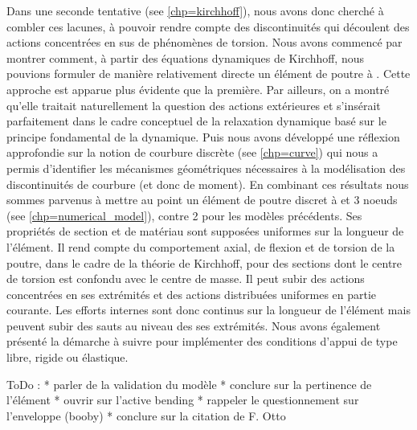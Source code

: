 Dans une seconde tentative (see \cref{chp=kirchhoff}), nous avons donc cherché à combler ces lacunes, à pouvoir rendre compte des discontinuités qui découlent des actions concentrées en sus de phénomènes de torsion. Nous avons commencé par montrer comment, à partir des équations dynamiques de Kirchhoff, nous pouvions formuler de manière relativement directe un élément de poutre à . Cette approche est apparue plus évidente que la première. Par ailleurs, on a montré qu'elle traitait naturellement la question des actions extérieures et s'insérait parfaitement dans le cadre conceptuel de la relaxation dynamique basé sur le principe fondamental de la dynamique. Puis nous avons développé une réflexion approfondie sur la notion de courbure discrète (see \cref{chp=curve}) qui nous a permis d'identifier les mécanismes géométriques nécessaires à la modélisation des discontinuités de courbure (et donc de moment). En combinant ces résultats nous sommes parvenus à mettre au point un élément de poutre discret à  et 3 noeuds (see \cref{chp=numerical_model}), contre 2 pour les modèles précédents. Ses propriétés de section et de matériau sont supposées uniformes sur la longueur de l'élément. Il rend compte du comportement axial, de flexion et de torsion de la poutre, dans le cadre de la théorie de Kirchhoff, pour des sections dont le centre de torsion est confondu avec le centre de masse. Il peut subir des actions concentrées en ses extrémités et des actions distribuées uniformes en partie courante. Les efforts internes sont donc continus sur la longueur de l'élément mais peuvent subir des sauts au niveau des ses extrémités. Nous avons également présenté la démarche à suivre pour implémenter des conditions d'appui de type libre, rigide ou élastique.

ToDo :
* parler de la validation du modèle
* conclure sur la pertinence de l'élément
* ouvrir sur l'active bending
* rappeler le questionnement sur l'enveloppe (booby)
* conclure sur la citation de F. Otto

